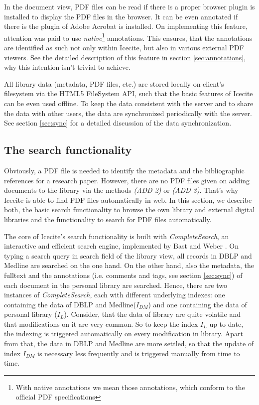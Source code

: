 In the document view, PDF files can be read if there is a proper browser plugin is installed to display the PDF files in the browser. It can be even annotated if there is the plugin of Adobe Acrobat is installed. On implementing this feature, attention was paid to use \textit{native}\footnote{With native annotations we mean those annotations, which conform to the official PDF specifications} annotations. This ensures, that the annotations are identified as such not only within Icecite, but also in various external PDF viewers. See the detailed description of this feature in section \ref{sec:annotations}, why this intention isn't trivial to achieve.

All library data (metadata, PDF files, etc.) are stored locally on client's filesystem via the HTML5 FileSystem API, such that the basic features of Icecite can be even used offline. To keep the data consistent with the server and to share the data with other users, the data are synchronized periodically with the server. See section \ref{sec:sync} for a detailed discussion of the data synchronization.

\subsection{The search functionality}\label{sec:search}
Obviously, a PDF file is needed to identify the metadata and the bibliographic references for a research paper. However, there are no PDF files given on adding documents to the library via the methods \textit{(ADD 2)} or \textit{(ADD 3)}. That's why Icecite is able to find PDF files automatically in web. In this section, we describe both, the basic search functionality to browse the own library and external digital libraries and the functionality to search for PDF files automatically.

The core of Icecite's search functionality is built with \textit{CompleteSearch}, an interactive and efficient search engine, implemented by Bast and Weber \cite{DBLP:conf/cidr/BastW07}. On typing a search query in search field of the library view, all records in DBLP and Medline are searched on the one hand. On the other hand, also the metadata, the fulltext and the annotations (i.e. comments and tags, see section \ref{sec:sync}) of each document in the personal library are searched. Hence, there are two instances of \textit{CompleteSearch}, each with different underlying indexes: one containing the data of DBLP and Medline($I_{DM}$) and one containing the data of personal library ($I_L$). Consider, that the data of library are quite volatile and that modifications on it are very common. So to keep the index $I_L$ up to date, the indexing is triggered automatically on every modification in library. Apart from that, the data in DBLP and Medline are more settled, so that the update of index $I_{DM}$ is necessary less frequently and is triggered manually from time to time.

